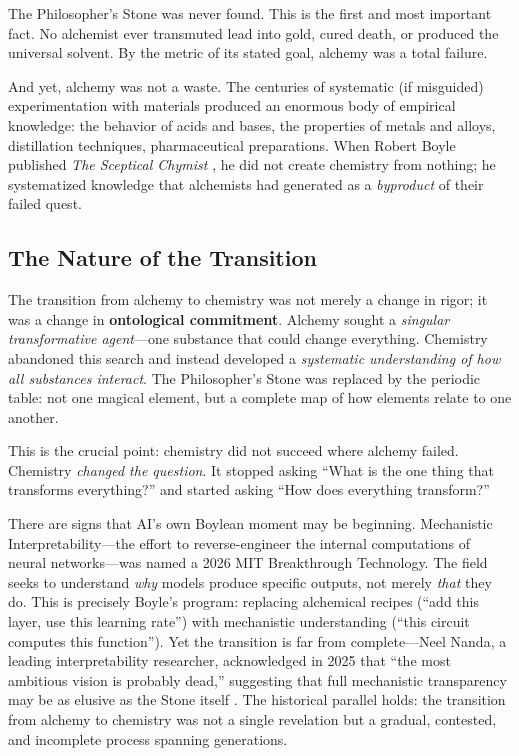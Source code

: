 \documentclass[12pt]{article}
\begin{document}
The Philosopher's Stone was never found. This is the first and most important fact. No alchemist ever transmuted lead into gold, cured death, or produced the universal solvent. By the metric of its stated goal, alchemy was a total failure.

And yet, alchemy was not a waste. The centuries of systematic (if misguided) experimentation with materials produced an enormous body of empirical knowledge: the behavior of acids and bases, the properties of metals and alloys, distillation techniques, pharmaceutical preparations. When Robert Boyle published \emph{The Sceptical Chymist} \citep{boyle1661}, he did not create chemistry from nothing; he systematized knowledge that alchemists had generated as a \emph{byproduct} of their failed quest.

\subsection{The Nature of the Transition}
\label{sec:transition}

The transition from alchemy to chemistry was not merely a change in rigor; it was a change in \textbf{ontological commitment}. Alchemy sought a \emph{singular transformative agent}---one substance that could change everything. Chemistry abandoned this search and instead developed a \emph{systematic understanding of how all substances interact}. The Philosopher's Stone was replaced by the periodic table: not one magical element, but a complete map of how elements relate to one another.

This is the crucial point: chemistry did not succeed where alchemy failed. Chemistry \emph{changed the question}. It stopped asking ``What is the one thing that transforms everything?'' and started asking ``How does everything transform?''

There are signs that AI's own Boylean moment may be beginning. Mechanistic Interpretability---the effort to reverse-engineer the internal computations of neural networks---was named a 2026 MIT Breakthrough Technology. The field seeks to understand \emph{why} models produce specific outputs, not merely \emph{that} they do. This is precisely Boyle's program: replacing alchemical recipes (``add this layer, use this learning rate'') with mechanistic understanding (``this circuit computes this function''). Yet the transition is far from complete---Neel Nanda, a leading interpretability researcher, acknowledged in 2025 that ``the most ambitious vision is probably dead,'' suggesting that full mechanistic transparency may be as elusive as the Stone itself \citep{nanda2025}. The historical parallel holds: the transition from alchemy to chemistry was not a single revelation but a gradual, contested, and incomplete process spanning generations.
\end{document}
